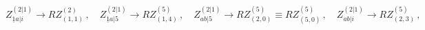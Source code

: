 \begin{equation}
\label{scal2}
Z^{(2|1)}_{\underline{1}a|i} \rightarrow R Z^{(2)}_{(1,1)} \, , \quad 
Z^{(2|1)}_{\underline{1}a|5} \rightarrow R Z^{(5)}_{(1,4)} \, , \quad
Z^{(2|1)}_{ab|5} \rightarrow R Z^{(5)}_{(2,0)}\equiv R Z^{(5)}_{(5,0)}  \, ,\quad
Z^{(2|1)}_{ab|i} \rightarrow R Z^{(5)}_{(2,3)} \, ,
\end{equation}

